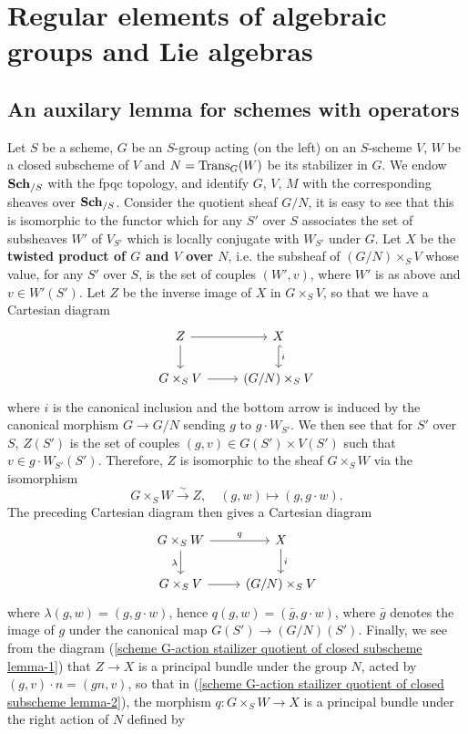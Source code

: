 \section{Regular elements of algebraic groups and Lie algebras}
\subsection{An auxilary lemma for schemes with operators}
Let $S$ be a scheme, $G$ be an $S$-group acting (on the left) on an $S$-scheme $V$, $W$ be a closed subscheme of $V$ and $N=\mathrm{Trans}_G(W)$ be its stabilizer in $G$. We endow $\mathbf{Sch}_{/S}$ with the fpqc topology, and identify $G$, $V$, $M$ with the corresponding sheaves over $\mathbf{Sch}_{/S}$. Consider the quotient sheaf $G/N$, it is easy to see that this is isomorphic to the functor which for any $S'$ over $S$ associates the set of subsheaves $W'$ of $V_{S'}$ which is locally conjugate with $W_{S'}$ under $G$. Let $X$ be the \textbf{twisted product of $G$ and $V$ over $N$}, i.e. the subsheaf of $(G/N)\times_SV$ whose value, for any $S'$ over $S$, is the set of couples $(W',v)$, where $W'$ is as above and $v\in W'(S')$. Let $Z$ be the inverse image of $X$ in $G\times_SV$, so that we have a Cartesian diagram
\begin{equation}\label{scheme G-action stailizer quotient of closed subscheme lemma-1}
\begin{tikzcd}
Z\ar[r]\ar[d]&X\ar[d,hook,"i"]\\
G\times_SV\ar[r]&(G/N)\times_SV
\end{tikzcd}
\end{equation}
where $i$ is the canonical inclusion and the bottom arrow is induced by the canonical morphism $G\to G/N$ sending $g$ to $g\cdot W_{S'}$. We then see that for $S'$ over $S$, $Z(S')$ is the set of couples $(g,v)\in G(S')\times V(S')$ such that $v\in g\cdot W_{S'}(S')$. Therefore, $Z$ is isomorphic to the sheaf $G\times_SW$ via the isomorphism
\[G\times_SW\stackrel{\sim}{\to}Z,\quad (g,w)\mapsto (g,g\cdot w).\]
The preceding Cartesian diagram then gives a Cartesian diagram
\begin{equation}\label{scheme G-action stailizer quotient of closed subscheme lemma-2}
\begin{tikzcd}
G\times_SW\ar[r,"q"]\ar[d,swap,"\lambda"]&X\ar[d,"i"]\\
G\times_SV\ar[r]&(G/N)\times_SV
\end{tikzcd}
\end{equation}
where $\lambda(g,w)=(g,g\cdot w)$, hence $q(g,w)=(\bar{g},g\cdot w)$, where $\bar{g}$ denotes the image of $g$ under the canonical map $G(S')\to(G/N)(S')$. Finally, we see from the diagram (\ref{scheme G-action stailizer quotient of closed subscheme lemma-1}) that $Z\to X$ is a principal bundle under the group $N$, acted by $(g,v)\cdot n=(gn,v)$, so that in (\ref{scheme G-action stailizer quotient of closed subscheme lemma-2}), the morphism $q:G\times_SW\to X$ is a principal bundle under the right action of $N$ defined by

